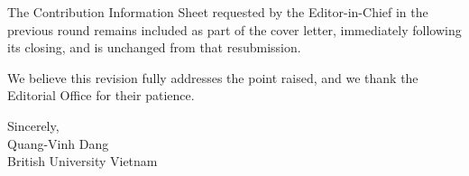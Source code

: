 \documentclass[11pt]{article}
\begin{document}
The Contribution Information Sheet requested by the Editor-in-Chief in the previous
round remains included as part of the cover letter, immediately following its
closing, and is unchanged from that resubmission.

\vspace{10pt}
\noindent We believe this revision fully addresses the point raised, and we thank
the Editorial Office for their patience.

\vspace{14pt}
\noindent Sincerely,\\
Quang-Vinh Dang\\
British University Vietnam
\end{document}
